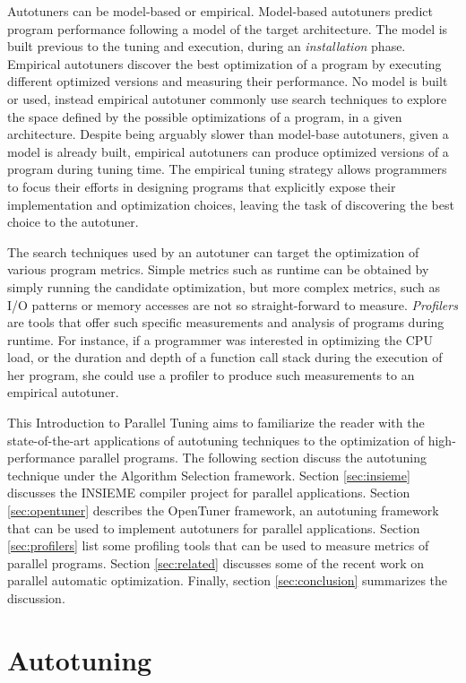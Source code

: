 \documentclass[a4paper, 12pt]{article}
\begin{document}
Autotuners can be model-based or empirical. Model-based autotuners predict 
program performance following a model of the target architecture. The model
is built previous to the tuning and execution, during an \emph{installation}
phase. Empirical autotuners discover the best optimization of a program by
executing different optimized versions and measuring their performance. No
model is built or used, instead empirical autotuner commonly use search
techniques to explore the space defined by the possible optimizations 
of a program, in a given architecture. Despite being arguably slower than
model-base autotuners, given a model is already built, empirical autotuners
can produce optimized versions of a program during tuning time. The empirical
tuning strategy allows programmers to focus their efforts in designing
programs that explicitly expose their implementation and optimization choices,
leaving the task of discovering the best choice to the autotuner.

The search techniques used by an autotuner can target the optimization of 
various program metrics. Simple metrics such as runtime can be obtained by 
simply running the candidate optimization, but more complex metrics, such 
as I/O patterns or memory accesses are not so straight-forward to measure.
\emph{Profilers} are tools that offer such specific measurements and analysis 
of programs during runtime. For instance, if a programmer was interested in 
optimizing the CPU load, or the duration and depth of a function call stack 
during the execution of her program, she could use a profiler to produce such 
measurements to an empirical autotuner.

This Introduction to Parallel Tuning aims to familiarize the reader with the
state-of-the-art applications of autotuning techniques to the optimization
of high-performance parallel programs. The following section discuss the
autotuning technique under the Algorithm Selection framework. Section 
\ref{sec:insieme} discusses the INSIEME compiler project for parallel
applications. Section \ref{sec:opentuner} describes the OpenTuner framework,
an autotuning framework that can be used to implement autotuners for parallel
applications. Section \ref{sec:profilers} list some profiling tools that can
be used to measure metrics of parallel programs. Section \ref{sec:related}
discusses some of the recent work on parallel automatic optimization.
Finally, section \ref{sec:conclusion} summarizes the discussion.

\section{Autotuning} \label{sec:autotuning}
\end{document}
